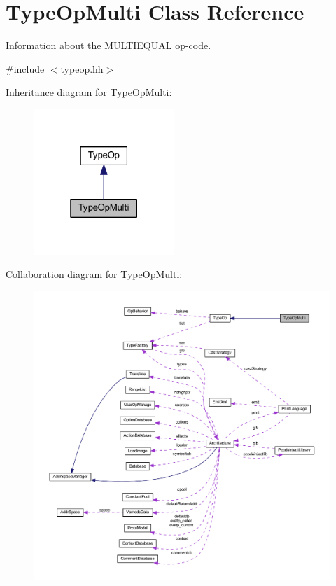 \hypertarget{class_type_op_multi}{}\section{Type\+Op\+Multi Class Reference}
\label{class_type_op_multi}


Information about the M\+U\+L\+T\+I\+E\+Q\+U\+AL op-\/code.  




{\ttfamily \#include $<$typeop.\+hh$>$}



Inheritance diagram for Type\+Op\+Multi\+:
\nopagebreak
\begin{figure}[H]
\begin{center}
\leavevmode
\includegraphics[width=151pt]{class_type_op_multi__inherit__graph}
\end{center}
\end{figure}


Collaboration diagram for Type\+Op\+Multi\+:
\nopagebreak
\begin{figure}[H]
\begin{center}
\leavevmode
\includegraphics[width=350pt]{class_type_op_multi__coll__graph}
\end{center}
\end{figure}
